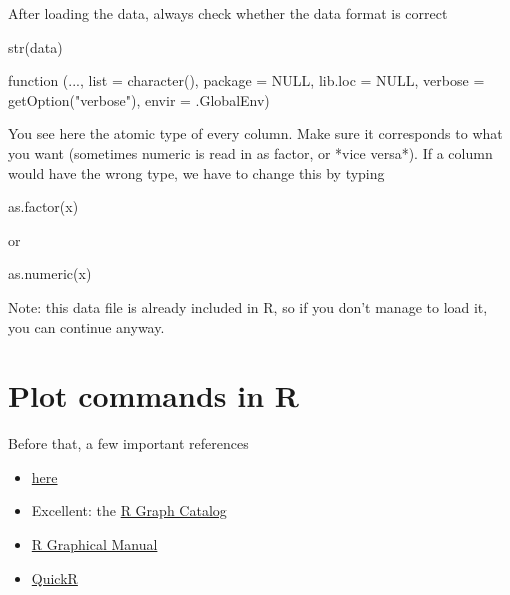 \documentclass[a4paper,twoside]{tufte-book}\usepackage[]{graphicx}\usepackage[]{color}
\begin{document}
\begin{Anhang}
After loading the data, always check whether the data format is correct 

\begin{Schunk}
\begin{Sinput}
str(data)
\end{Sinput}
\begin{Soutput}
function (..., list = character(), package = NULL, lib.loc = NULL, 
    verbose = getOption("verbose"), envir = .GlobalEnv)  
\end{Soutput}
\end{Schunk}

You see here the atomic type of every column. Make sure it corresponds to what you want (sometimes numeric is read in as factor, or *vice versa*). If a column would have the wrong type, we have to change this by typing

\begin{Schunk}
\begin{Sinput}
as.factor(x)
\end{Sinput}
\end{Schunk}
or 
\begin{Schunk}
\begin{Sinput}
as.numeric(x)
\end{Sinput}
\end{Schunk}


Note: this data file is already included in R, so if you don't manage to load it, you can continue anyway. 

\chapter{Plot commands in R}

Before that, a few important references 

\begin{itemize}
\item \href{http://rgraphgallery.blogspot.de/search/label/3%20vartiable%20plots}{here}
\item Excellent: the \href{http://shiny.stat.ubc.ca/r-graph-catalog/#}{R Graph Catalog}
\item \href{http://rgm3.lab.nig.ac.jp/RGM/R_image_list?page=2282&init=true}{R Graphical Manual}
\item \href{http://www.statmethods.net/graphs/line.html}{QuickR}
\end{itemize}




\end{Anhang}
\end{document}
